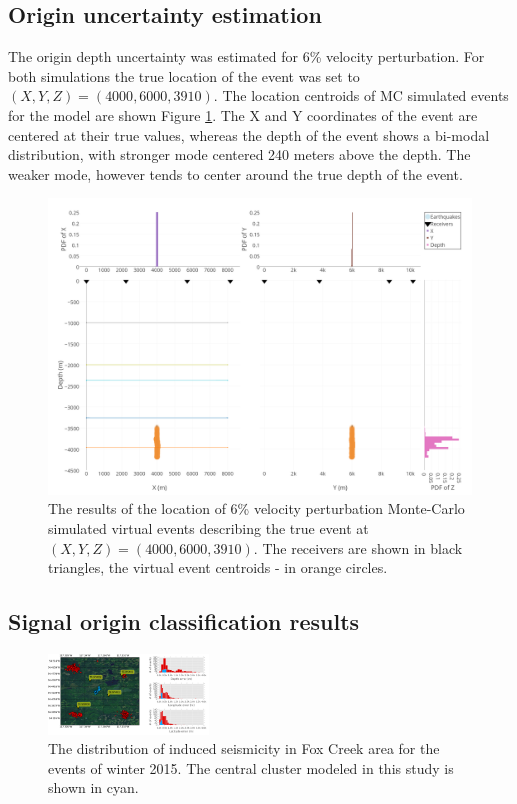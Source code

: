 \documentclass[letterpaper,11pt]{article}
\begin{document}
\subsection*{Origin uncertainty estimation}
The origin depth uncertainty was estimated for 6\% velocity perturbation. For both simulations the true location of the event was set to $(X,Y,Z) = (4000,6000,3910)$. The location centroids of MC simulated events for the model are shown Figure \ref{fig:sigma6}. The X and Y coordinates of the event are centered at their true values, whereas the depth of the event shows a bi-modal distribution, with stronger mode centered 240 meters above the depth. The weaker mode, however tends to center around the true depth of the event.

\begin{figure}[htb]
\begin{center}
\includegraphics[width=0.6\linewidth,angle=0]{./AntonBiryukov_bibtex/Figure1_6pct.png}
\end{center}
\vspace{-4mm}
\caption{The results of the location of 6\% velocity perturbation Monte-Carlo simulated virtual events describing the true event at $(X,Y,Z) = (4000,6000,3910)$. The receivers are shown in black triangles, the virtual event centroids - in orange circles.}
\label{fig:sigma6}
\end{figure}

\subsection*{Signal origin classification results}
\begin{figure}
\centering
\includegraphics[width=0.38\textwidth]{./AntonBiryukov_bibtex/figure_map_a.png}
\vspace{-4mm}
\caption{The distribution of induced seismicity in Fox Creek area for the events of winter 2015. The central cluster modeled in this study is shown in cyan.}
\label{fig:map_clusters}
\end{figure}
\end{document}
